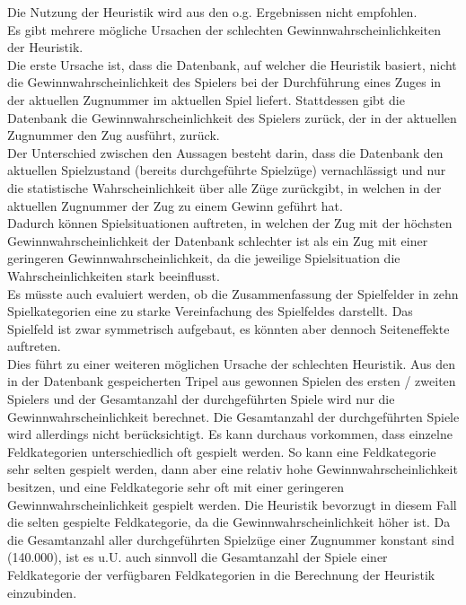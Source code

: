 Die Nutzung der Heuristik  wird aus den o.g. Ergebnissen nicht empfohlen.
\\Es gibt mehrere mögliche Ursachen der schlechten Gewinnwahrscheinlichkeiten der Heuristik.
\vspace{0.5cm}
\\Die erste Ursache ist, dass die Datenbank, auf welcher die Heuristik basiert, nicht die Gewinnwahrscheinlichkeit des Spielers bei der Durchführung eines Zuges in der aktuellen Zugnummer im aktuellen Spiel liefert. Stattdessen gibt die Datenbank die Gewinnwahrscheinlichkeit des Spielers zurück, der in der aktuellen Zugnummer den Zug ausführt, zurück.
\\Der Unterschied zwischen den Aussagen besteht darin, dass die Datenbank den aktuellen Spielzustand (bereits durchgeführte Spielzüge) vernachlässigt und nur die statistische Wahrscheinlichkeit über alle Züge zurückgibt, in welchen in der aktuellen Zugnummer der Zug zu einem Gewinn geführt hat.
\\Dadurch können Spielsituationen auftreten, in welchen der Zug mit der höchsten Gewinnwahrscheinlichkeit der Datenbank schlechter ist als ein Zug mit einer geringeren Gewinnwahrscheinlichkeit, da die jeweilige Spielsituation die Wahrscheinlichkeiten stark beeinflusst.
\vspace{0.5cm}
\\Es müsste auch evaluiert werden, ob die Zusammenfassung der Spielfelder in zehn Spielkategorien eine zu starke Vereinfachung des Spielfeldes darstellt. Das Spielfeld ist zwar symmetrisch aufgebaut, es könnten aber dennoch Seiteneffekte auftreten.
\vspace{0.5cm}
\\Dies führt zu einer weiteren möglichen Ursache der schlechten Heuristik. Aus den in der Datenbank gespeicherten Tripel aus gewonnen Spielen des ersten / zweiten Spielers und der Gesamtanzahl der durchgeführten Spiele wird nur die Gewinnwahrscheinlichkeit berechnet. Die Gesamtanzahl der durchgeführten Spiele wird allerdings nicht berücksichtigt. Es kann durchaus vorkommen, dass einzelne Feldkategorien unterschiedlich oft gespielt werden. So kann eine Feldkategorie sehr selten gespielt werden, dann aber eine relativ hohe Gewinnwahrscheinlichkeit besitzen, und eine Feldkategorie sehr oft mit einer geringeren Gewinnwahrscheinlichkeit gespielt werden. Die Heuristik bevorzugt in diesem Fall die selten gespielte Feldkategorie, da die Gewinnwahrscheinlichkeit höher ist. Da die Gesamtanzahl aller durchgeführten Spielzüge einer Zugnummer konstant sind (140.000), ist es u.U. auch sinnvoll die Gesamtanzahl der Spiele einer Feldkategorie der verfügbaren Feldkategorien in die Berechnung der Heuristik einzubinden.

